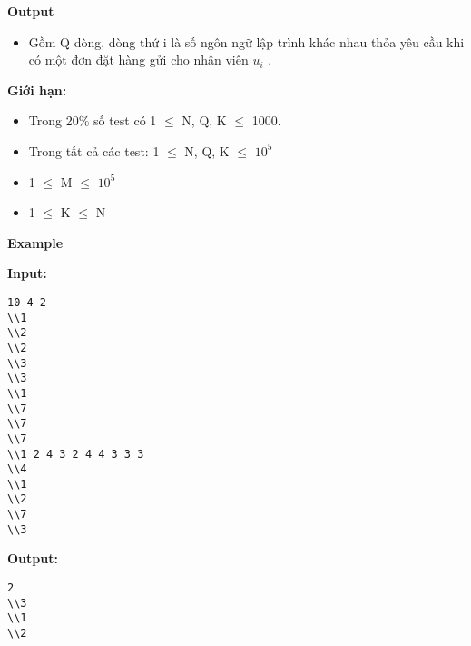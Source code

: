\textbf{    Output   }
\begin{itemize}
	\item     Gồm Q dòng, dòng thứ i là số ngôn ngữ lập trình khác nhau thỏa yêu cầu khi có một đơn đặt hàng gửi cho nhân viên $u_{i}$    .   
\end{itemize}

\textbf{    Giới hạn:   }
\begin{itemize}
	\item     Trong 20\% số test có 1  $\le$  N, Q, K       $\le$  1000.   
	\item     Trong tất cả các test: 1  $\le$  N, Q, K       $\le$  $10^{5}$
	\item     1  $\le$  M  $\le$  $10^{5}$
	\item     1  $\le$  K  $\le$  N   
\end{itemize}



\textbf{    Example   }

\textbf{    Input:   }
\begin{verbatim}
10 4 2
\\1
\\2
\\2
\\3
\\3
\\1
\\7
\\7
\\7
\\1 2 4 3 2 4 4 3 3 3
\\4
\\1
\\2
\\7
\\3\end{verbatim}

\textbf{    Output:   }
\begin{verbatim}
2
\\3
\\1
\\2\end{verbatim}
